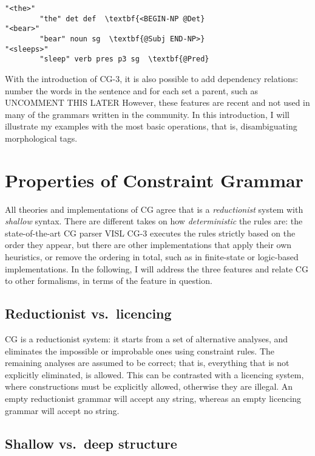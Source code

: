 \begin{verbatim}
"<the>"
        "the" det def  \textbf{<BEGIN-NP @Det}
"<bear>"
        "bear" noun sg  \textbf{@Subj END-NP>}
"<sleeps>"
        "sleep" verb pres p3 sg  \textbf{@Pred}

\end{verbatim}

With the introduction of CG-3, it is also possible to add dependency
relations: number the words in the sentence and for each set a parent,
such as UNCOMMENT THIS LATER%
However, these features are recent and not used in many of the grammars written 
in the community. In this introduction, I will illustrate my examples with the 
most basic operations, that is, disambiguating morphological tags.


\section*{Properties of Constraint Grammar}\label{properties}

All theories and implementations of CG agree that is a \emph{reductionist}
system with \emph{shallow} syntax. There are different takes on how
\emph{deterministic} the rules are: the state-of-the-art CG parser VISL CG-3
executes the rules strictly based on the order they appear, but there
are other implementations that apply their own heuristics, or remove the
ordering in total, such as in finite-state or logic-based implementations. 
In the following, I will address the three features and relate CG to
other formalisms, in terms of the feature in question.

\subsection*{Reductionist vs.~licencing}\label{reductionist-vs.licencing}

CG is a reductionist system: it starts from a set of alternative
analyses, and eliminates the impossible or improbable ones using
constraint rules. The remaining analyses are assumed to be correct; that
is, everything that is not explicitly eliminated, is allowed. This can
be contrasted with a licencing system, where constructions must
be explicitly allowed, otherwise they are illegal. An empty
reductionist grammar will accept any string, whereas an empty
licencing grammar will accept no string.


\subsection*{Shallow vs.~deep structure}\label{shallow-vs.deep-structure}

